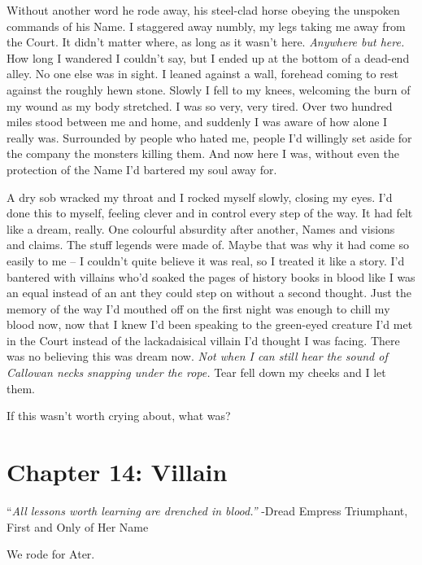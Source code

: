 \documentclass[12pt, openany]{book}
\begin{document}
Without another word he rode away, his steel-clad horse obeying the unspoken commands of his Name. I staggered away numbly, my legs taking me away from the Court. It didn’t matter where, as long as it wasn’t here. \textit{Anywhere but here.} How long I wandered I couldn’t say, but I ended up at the bottom of a dead-end alley. No one else was in sight. I leaned against a wall, forehead coming to rest against the roughly hewn stone. Slowly I fell to my knees, welcoming the burn of my wound as my body stretched. I was so very, very tired. Over two hundred miles stood between me and home, and suddenly I was aware of how alone I really was. Surrounded by people who hated me, people I’d willingly set aside for the company the monsters killing them. And now here I was, without even the protection of the Name I’d bartered my soul away for.

A dry sob wracked my throat and I rocked myself slowly, closing my eyes. I’d done this to myself, feeling clever and in control every step of the way. It had felt like a dream, really. One colourful absurdity after another, Names and visions and claims. The stuff legends were made of. Maybe that was why it had come so easily to me – I couldn’t quite believe it was real, so I treated it like a story. I’d bantered with villains who’d soaked the pages of history books in blood like I was an equal instead of an ant they could step on without a second thought. Just the memory of the way I’d mouthed off on the first night was enough to chill my blood now, now that I knew I’d been speaking to the green-eyed creature I’d met in the Court instead of the lackadaisical villain I’d thought I was facing. There was no believing this was dream now. \textit{Not when I can still hear the sound of Callowan necks snapping under the rope. }Tear fell down my cheeks and I let them.

If this wasn’t worth crying about, what was?
\clearpage
\chapter{Chapter 14: Villain}

“\textit{All lessons worth learning are drenched in blood.”}
-Dread Empress Triumphant, First and Only of Her Name

We rode for Ater.
\end{document}
